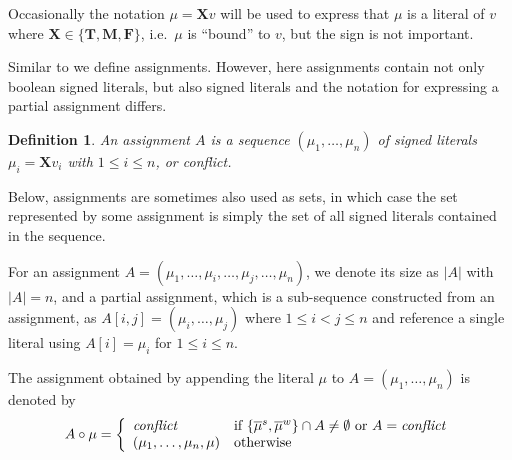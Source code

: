 \documentclass{vutinfth} %
\newtheorem{definition}{Definition}[section]
\newtheorem*{remark}{Remark}
\newcommand{\negstrong}[1]{\overline{#1}^s}
\newcommand{\negweak}[1]{\overline{#1}^w}
\newcommand{\ass}{A}
\newcommand{\bT}{\mathbf{T}}
\newcommand{\bM}{\mathbf{M}}
\newcommand{\bF}{\mathbf{F}}
\newcommand{\bX}{\mathbf{X}}
\newcommand{\sgl}{\mu}
\newcommand{\thrice}{{\{\bT, \bM, \bF \}}}
\begin{document}
Occasionally the notation $\sgl = \bX v$ will be used to express that $\sgl$ is a literal of $v$ where $\bX \in \thrice$, i.e.~$\sgl$ is \enquote{bound} to $v$, but the sign is not important.

Similar to \cite[Section 2, p.~3]{clasp} we define assignments. However, here assignments contain not only boolean signed literals, but also signed literals and the notation for expressing a partial assignment differs.

\begin{definition}
An \emph{assignment} $\ass$ is a sequence $(\sgl_1, \ldots, \sgl_n)$ of signed literals $\sgl_i = \bX v_i$ with $1 \leq i \leq n$, or \emph{conflict}.
\end{definition}

Below, assignments are sometimes also used as sets, in which case the set represented by some assignment is simply the set of all signed literals contained in the sequence.

For an assignment $\ass = (\sgl_1, \ldots, \sgl_i, \ldots, \sgl_j, \ldots, \sgl_n)$, we denote its size as $|\ass|$ with $|\ass| = n$, and a partial assignment, which is a sub-sequence constructed from an assignment, as $\ass[i,j] = (\sgl_i, \ldots, \sgl_j)$ where $1 \leq i < j \leq n$ and reference a single literal using $A[i] = \sgl_i$ for $1 \leq i \leq n$.

The assignment obtained by appending the literal $\sgl$ to $\ass = (\sgl_1, \ldots, \sgl_n)$ is denoted by $$\ass \circ \sgl = \left\{\begin{array}{ll}
        
        \emph{conflict} & \text{if } \{ \negstrong{\sgl}, \negweak{\sgl} \} \cap \ass \not = \emptyset \text{ or } \ass = \emph{conflict}\\
        (\sgl_1, \ldots, \sgl_{n}, \sgl) & \text{otherwise} \\
        \end{array}\right.$$

\end{document}
